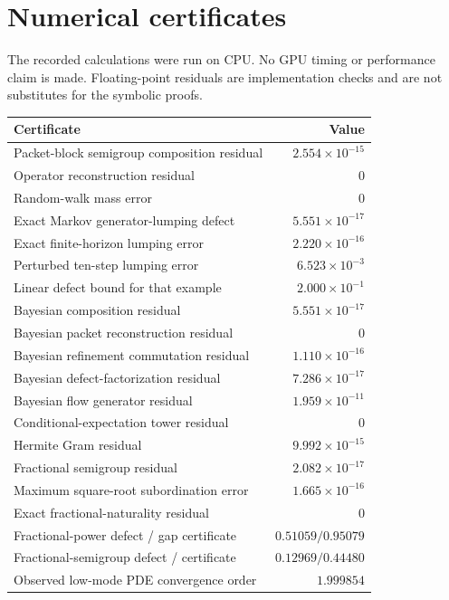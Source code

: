 \documentclass[11pt,letterpaper]{article}
\theoremstyle{plain}
\theoremstyle{plain}
\theoremstyle{plain}
\theoremstyle{definition}
\theoremstyle{definition}
\theoremstyle{definition}
\theoremstyle{definition}
\theoremstyle{definition}
\theoremstyle{remark}
\theoremstyle{remark}
\theoremstyle{remark}
\theoremstyle{remark}
\theoremstyle{remark}
\theoremstyle{remark}
\begin{document}
\FloatBarrier
\section{Numerical certificates}\label{core:section:16}

The recorded calculations were run on CPU. No GPU timing or performance claim is made. Floating-point residuals are implementation checks and are not substitutes for the symbolic proofs.

\begin{table}[htbp]
\centering
\small
\begin{tabular}{L{0.56\textwidth} r}
\toprule
Certificate & Value\\
\midrule
Packet-block semigroup composition residual & $2.554\times10^{-15}$\\
Operator reconstruction residual & $0$\\
Random-walk mass error & $0$\\
Exact Markov generator-lumping defect & $5.551\times10^{-17}$\\
Exact finite-horizon lumping error & $2.220\times10^{-16}$\\
Perturbed ten-step lumping error & $6.523\times10^{-3}$\\
Linear defect bound for that example & $2.000\times10^{-1}$\\
Bayesian composition residual & $5.551\times10^{-17}$\\
Bayesian packet reconstruction residual & $0$\\
Bayesian refinement commutation residual & $1.110\times10^{-16}$\\
Bayesian defect-factorization residual & $7.286\times10^{-17}$\\
Bayesian flow generator residual & $1.959\times10^{-11}$\\
Conditional-expectation tower residual & $0$\\
Hermite Gram residual & $9.992\times10^{-15}$\\
Fractional semigroup residual & $2.082\times10^{-17}$\\
Maximum square-root subordination error & $1.665\times10^{-16}$\\
Exact fractional-naturality residual & $0$\\
Fractional-power defect / gap certificate & $0.51059 / 0.95079$\\
Fractional-semigroup defect / certificate & $0.12969 / 0.44480$\\
Observed low-mode PDE convergence order & $1.999854$\\

\end{tabular}
\end{table}
\end{document}
